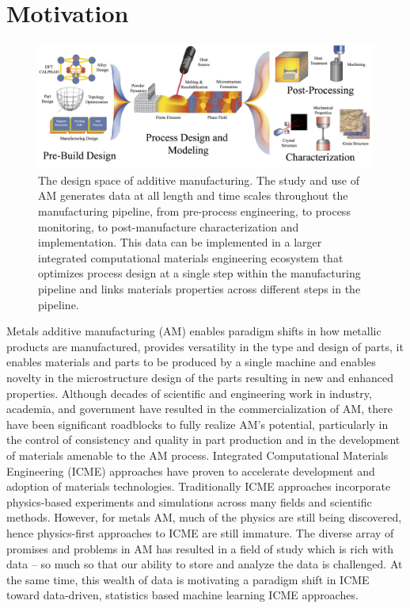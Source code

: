 \vspace{-2em}
\section{Motivation}
\begin{figure}[t]
	\includegraphics[width=1\linewidth]{Images/AMgene.png}
	\caption{The design space of additive manufacturing. The study and use of AM generates data at all length and time scales throughout the manufacturing pipeline, from pre-process engineering, to process monitoring, to post-manufacture characterization and implementation. This data can be implemented in a larger integrated computational materials engineering ecosystem that optimizes process design at a single step within the manufacturing pipeline and links materials properties across different steps in the pipeline.}
	\label{AMgene}
\end{figure}

Metals additive manufacturing (AM) enables paradigm shifts in how metallic products are manufactured, provides versatility in the type and design of parts, it enables materials and parts to be produced by a single machine and enables novelty in the microstructure design of the parts resulting in new and enhanced properties. Although decades of scientific and engineering work in industry, academia, and government have resulted in the commercialization of AM, there have been significant roadblocks to fully realize AM's potential, particularly in the control of consistency and quality in part production and in the development of materials amenable to the AM process. Integrated Computational Materials Engineering (ICME) approaches have proven to accelerate development and adoption of materials technologies. Traditionally ICME approaches incorporate physics-based experiments and simulations across many fields and scientific methods. However, for metals AM, much of the physics are still being discovered, hence physics-first approaches to ICME are still immature. The diverse array of promises and problems in AM has resulted in a field of study which is rich with data -- so much so that our ability to store and analyze the data is challenged. At the same time, this wealth of data is motivating a paradigm shift in ICME toward data-driven, statistics based machine learning ICME approaches. 

